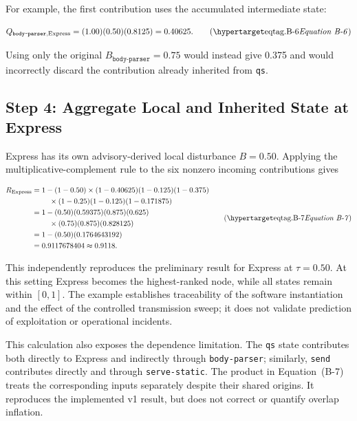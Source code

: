 For example, the first contribution uses the accumulated intermediate state:

\[
Q_{\texttt{body-parser},\mathrm{Express}}
 =(1.00)(0.50)(0.8125)=0.40625.
\eqtag{B-6}
\]

Using only the original \(B_{\texttt{body-parser}}=0.75\) would instead give
0.375 and would incorrectly discard the contribution already inherited from
\texttt{qs}.

\subsection{Step 4: Aggregate Local and Inherited State at Express}

Express has its own advisory-derived local disturbance \(B=0.50\). Applying
the multiplicative-complement rule to the six nonzero incoming contributions
gives

\[
\begin{aligned}
R_{\mathrm{Express}}
={}&1-(1-0.50)
\times(1-0.40625)(1-0.125)(1-0.375)\\
&\quad\times(1-0.25)(1-0.125)(1-0.171875)\\
={}&1-(0.50)(0.59375)(0.875)(0.625)\\
&\quad\times(0.75)(0.875)(0.828125)\\
={}&1-(0.50)(0.1764643192)\\
={}&0.9117678404\approx0.9118.
\end{aligned}
\eqtag{B-7}
\]

This independently reproduces the preliminary result for Express at
\(\tau=0.50\). At this setting Express becomes the highest-ranked node, while
all states remain within \([0,1]\). The example establishes traceability of
the software instantiation and the effect of the controlled transmission
sweep; it does not validate prediction of exploitation or operational
incidents.

This calculation also exposes the dependence limitation. The
\texttt{qs} state contributes both directly to Express and indirectly
through \texttt{body-parser}; similarly, \texttt{send} contributes
directly and through \texttt{serve-static}. The product in
Equation~(B-7) treats the corresponding inputs separately despite their
shared origins. It reproduces the implemented v1 result, but does not
correct or quantify overlap inflation.
